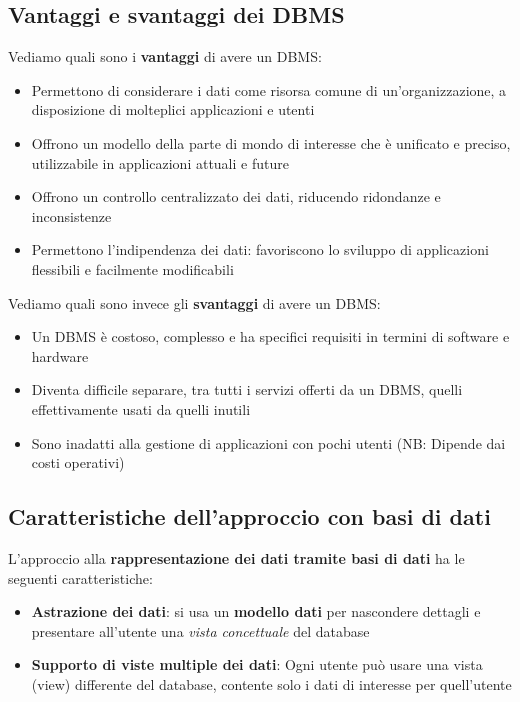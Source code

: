 \documentclass[12pt]{article}
\begin{document}
\subsection{Vantaggi e svantaggi dei DBMS}
Vediamo quali sono i \textbf{vantaggi} di avere un DBMS:
\begin{itemize}
    \item Permettono di considerare i dati come risorsa comune di un'organizzazione, a disposizione di molteplici applicazioni e utenti
    \item Offrono un modello della parte di mondo di interesse che è unificato e preciso, utilizzabile in applicazioni attuali e future
    \item Offrono un controllo centralizzato dei dati, riducendo ridondanze e inconsistenze
    \item Permettono l'indipendenza dei dati: favoriscono lo sviluppo di applicazioni flessibili e facilmente modificabili
\end{itemize}
Vediamo quali sono invece gli \textbf{svantaggi} di avere un DBMS:
\begin{itemize}
    \item Un DBMS è costoso, complesso e ha specifici requisiti in termini di software e hardware
    \item Diventa difficile separare, tra tutti i servizi offerti da un DBMS, quelli effettivamente usati da quelli inutili
    \item Sono inadatti alla gestione di applicazioni con pochi utenti (NB: Dipende dai costi operativi)
\end{itemize}
\subsection{Caratteristiche dell'approccio con basi di dati}
L'approccio alla \textbf{rappresentazione dei dati tramite basi di dati} ha le seguenti caratteristiche:
\begin{itemize}
    \item \textbf{Astrazione dei dati}: si usa un \textbf{modello dati} per nascondere dettagli e presentare all'utente una \textit{vista concettuale} del database
    \item \textbf{Supporto di viste multiple dei dati}: Ogni utente può usare una vista (view) differente del database, contente solo i dati di interesse per quell'utente
\end{itemize}
\end{document}
